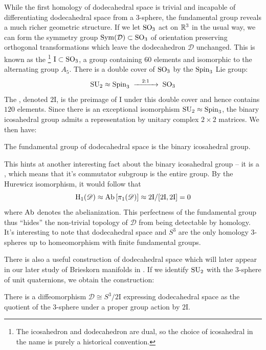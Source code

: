 While the first homology of dodecahedral space is trivial and incapable of differentiating dodecahedral space from a 3-sphere, the fundamental group reveals a much richer geometric structure. If we let ${\operatorname{SO}}_3$ act on $\mathbb{R}^3$ in the usual way, we can form the symmetry group $\operatorname{\operatorname{Sym}}(\mathcal{D})\subset {\operatorname{SO}}_3$ of orientation preserving orthogonal transformations which leave the dodecahedron $\mathcal{D}$ unchanged. This is known as the \footnote{The icosahedron and dodecahedron are dual, so the choice of icosahedral in the name is purely a historical convention.} $\mathrm{I}\subset {\operatorname{SO}}_3$, a group containing $60$ elements and isomorphic to the alternating group $A_5$. There is a double cover of ${\operatorname{SO}}_3$ by the ${\operatorname{Spin}}_3$ Lie group:
\[
	\SU_2\cong \Spin_3\lkxto[2:1] \SO_3
\]
The , denoted $2\mathrm{I}$, is the preimage of $\mathrm{I}$ under this double cover and hence contains $120$ elements. Since there is an exceptional isomorphism ${\operatorname{SU}}_2\approx {\operatorname{Spin}}_3$, the binary icosahedral group admits a representation by unitary complex $2\times 2$ matrices.
We then have:
\begin{proposition}
	The fundamental group of dodecahedral space is the binary icosahedral group.
\end{proposition}
This hints at another interesting fact about the binary icosahedral group -- it is a , which means that it's commutator subgroup is the entire group. By the Hurewicz isomorphism, it would follow that
\[
	\operatorname{H}_1(\mathscr{D}) \approx \operatorname{\operatorname{Ab}}\left[ \pi_1(\mathscr{D})\right] \approx 2\mathrm{I}/[2\mathrm{I}, 2\mathrm{I}] = 0
\]
where $\operatorname{\operatorname{Ab}}$ denotes the abelianization. This perfectness of the fundamental group thus ``hides'' the non-trivial topology of $\mathscr{D}$ from being detectable by homology. It's interesting to note that dodecahedral space and $S^3$ are the only homology $3$-spheres up to homeomorphism with finite fundamental groups.

There is also a useful construction of dodecahedral space which will later appear in our later study of Brieskorn manifolds in . If we identify ${\operatorname{SU}}_2$ with the $3$-sphere of unit quaternions, we obtain the construction:

\begin{proposition}
	There is a diffeomorphism $\mathscr{D} \cong S^3 / 2\mathrm{I}$ expressing dodecahedral space as the quotient of the $3$-sphere under a proper group action by $2\mathrm{I}$.
\end{proposition}

